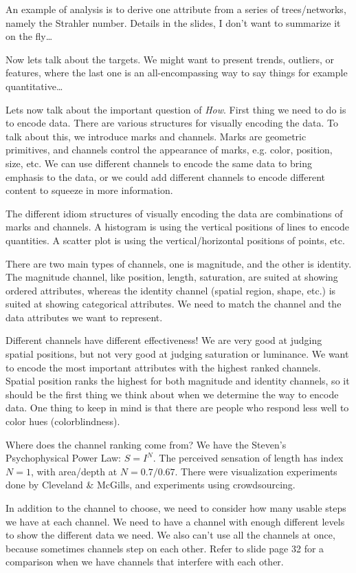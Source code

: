 \documentclass[letterpaper, 11pt]{article}
\numberwithin{equation}{section}
\numberwithin{figure}{section}
\begin{document}
An example of analysis is to derive one attribute from a series of
trees/networks, namely the Strahler number. Details in the slides, I don't want
to summarize it on the fly\dots

Now lets talk about the targets. We might want to present trends, outliers, or
features, where the last one is an all-encompassing way to say things for
example quantitative\dots

Lets now talk about the important question of \emph{How}. First thing we need to
do is to encode data. There are various structures for visually encoding the
data. To talk about this, we introduce marks and channels. Marks are geometric
primitives, and channels control the appearance of marks, e.g. color, position,
size, etc. We can use different channels to encode the same data to bring
emphasis to the data, or we could add different channels to encode different
content to squeeze in more information.

The different idiom structures of visually encoding the data are combinations of
marks and channels. A histogram is using the vertical positions of lines to
encode quantities. A scatter plot is using the vertical/horizontal positions of
points, etc.

There are two main types of channels, one is magnitude, and the other is
identity. The magnitude channel, like position, length, saturation, are suited
at showing ordered attributes, whereas the identity channel (spatial region,
shape, etc.) is suited at showing categorical attributes. We need to match the
channel and the data attributes we want to represent.

Different channels have different effectiveness! We are very good at judging
spatial positions, but not very good at judging saturation or luminance. We want
to encode the most important attributes with the highest ranked channels.
Spatial position ranks the highest for both magnitude and identity channels, so
it should be the first thing we think about when we determine the way to encode
data. One thing to keep in mind is that there are people who respond less well
to color hues (colorblindness).

Where does the channel ranking come from? We have the Steven's Psychophysical
Power Law: $S = I^N$. The perceived sensation of length has index $N=1$, with
area/depth at $N=0.7/0.67$. There were visualization experiments done by
Cleveland \& McGills, and experiments using crowdsourcing.

In addition to the channel to choose, we need to consider how many usable steps
we have at each channel. We need to have a channel with enough different levels
to show the different data we need. We also can't use all the channels at once,
because sometimes channels step on each other. Refer to slide page 32 for a
comparison when we have channels that interfere with each other.
\end{document}

